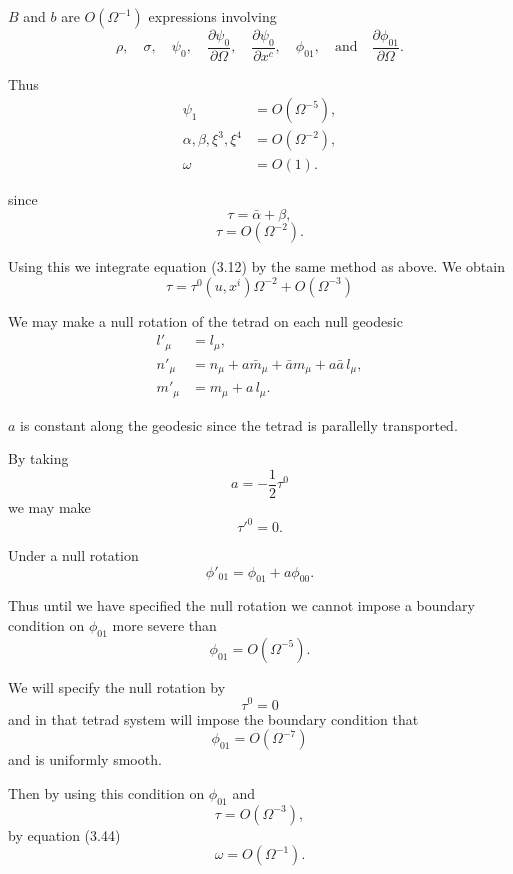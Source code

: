 $B$ and $b$ are $O(\Omega^{-1})$ expressions involving
\[
\rho,\quad
\sigma,\quad
\psi_0,\quad
\frac{\partial\psi_0}{\partial\Omega},\quad
\frac{\partial\psi_0}{\partial x^c},\quad
\phi_{01},
\quad\text{and}\quad
\frac{\partial\phi_{01}}{\partial\Omega}.
\]

Thus
\begin{equation}
\begin{aligned}
\psi_1 &= O(\Omega^{-5}),\\
\alpha,\beta,\xi^3,\xi^4 &= O(\Omega^{-2}),\\
\omega &= O(1).
\end{aligned}
\tag{6.22}
\end{equation}

since
\[
\tau = \bar{\alpha}+\beta,
\]
\[
\tau = O(\Omega^{-2}).
\]


Using this we integrate equation (3.12) by the same
method as above. We obtain
\begin{equation}
\tau
=
\tau^{0}(u,x^{i})\Omega^{-2}
+
O(\Omega^{-3})
\tag{6.23}
\end{equation}

We may make a null rotation of the tetrad on each null
geodesic
\begin{equation}
\begin{aligned}
l'_{\mu} &= l_{\mu},\\
n'_{\mu} &= n_{\mu}
          + a\bar{m}_{\mu}
          + \bar{a}m_{\mu}
          + a\bar{a}\,l_{\mu},\\
m'_{\mu} &= m_{\mu}+a\,l_{\mu}.
\end{aligned}
\tag{6.24}
\end{equation}

$a$ is constant along the geodesic since the tetrad is
parallelly transported.

By taking
\[
a=-\frac{1}{2}\tau^{0}
\]
we may make
\[
\tau'^{0}=0.
\]

Under a null rotation
\[
\phi'_{01}
=
\phi_{01}
+
a\phi_{00}.
\]

Thus until we have specified the null rotation we cannot
impose a boundary condition on $\phi_{01}$ more severe than
\[
\phi_{01}=O(\Omega^{-5}).
\]

We will specify the null rotation by
\[
\tau^{0}=0
\]
and in that tetrad system will impose the boundary condition
that
\[
\phi_{01}=O(\Omega^{-7})
\]
and is uniformly smooth.

Then by using this condition on $\phi_{01}$ and
\[
\tau=O(\Omega^{-3}),
\]
by equation (3.44)
\[
\omega=O(\Omega^{-1}).
\]


